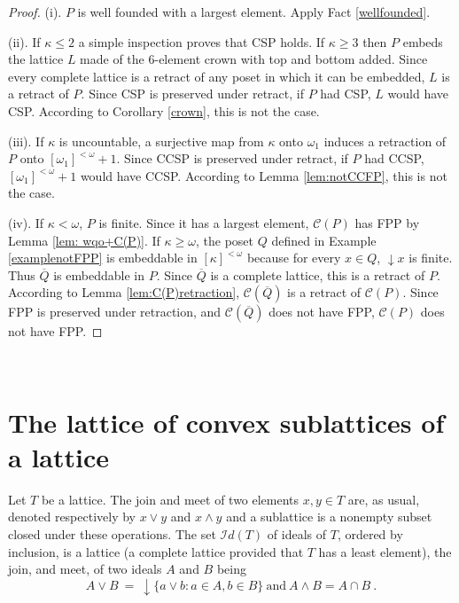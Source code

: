 \documentclass[12pt]{amsart}
\begin{document}
\begin{proof}
(i). $P$ is well founded with a largest element. Apply Fact \ref{wellfounded}. 

\vspace{.3cm}
\noindent
(ii). If $\kappa\leq 2$ a simple inspection proves that CSP
holds. If $\kappa \geq 3$ then $P$ embeds the lattice $L$ made of the
$6$-element crown with top and bottom added. Since every complete
lattice is a retract of any poset in which it can be embedded, $L$ is
a retract of $P$. Since CSP is preserved under retract, if $P$ had
CSP, $L$ would have CSP. According to Corollary \ref{crown}, this is
not the case.

\vspace{.3cm}
\noindent
(iii). If $\kappa$ is uncountable, a surjective map from $\kappa$
onto $\omega_1$ induces a retraction of $P$ onto $[\omega_1]^{<\omega}+1$. Since
CCSP is preserved under retract, if $P$ had CCSP, $[\omega_1]^{<\omega}+1$ would
have CCSP. According to Lemma \ref{lem:notCCFP}, this is not the case.

\vspace{.3cm}
\noindent
(iv). If $\kappa<\omega$, $P$ is finite.  Since it has a largest 
element, $\mathcal C (P)$ has FPP  by Lemma \ref{lem: wqo+C(P)}.  If
$\kappa\geq \omega$, the poset $Q$ defined in Example
\ref{examplenotFPP} is embeddable in $[\kappa]^{<\omega}$ because for
every $x\in Q$, ${\downarrow \!\!} x$ is finite. Thus $\overline Q$ is
embeddable in $P$. Since $\overline Q$ is a complete lattice, this is
a retract of $P$. According to Lemma \ref{lem:C(P)retraction},
$\mathcal C (\overline Q)$ is a retract of $\mathcal C (P)$. Since FPP
is preserved under retraction, and $\mathcal C (\overline Q)$ does not have FPP,
$\mathcal C (P)$ does not have FPP. \end{proof}\\

\section{The lattice of convex sublattices of a lattice}\label{sublattices}

Let $T$ be a lattice. The join and meet of two elements $x,y\in T$
are, as usual, denoted respectively by $x\vee y$ and $x\wedge y$ and a
sublattice is a nonempty subset closed under these operations.  The
set $\mathcal {I}d (T)$ of ideals of $T$, ordered by inclusion, is a
lattice (a complete lattice provided that $T$ has a least element),
the join, and meet, of two ideals $A$ and $B$ being $$A\vee B \ = \
{\downarrow \!\!}\{a \vee b: a\in A, b\in B\} \ \text{and} \ A\wedge B =
A\cap B \ .$$
\end{document}
